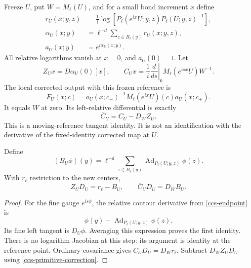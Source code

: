 Freeze \(U\), put \(W=M_\ell(U)\), and for a small bond increment
\(x\) define
\begin{equation}
 \begin{split}
 r_U(x;y,z)
   &=\frac1i\log\!\left[
       P_\ell(e^{ix}U;y,z)P_\ell(U;y,z)^{-1}\right],\\
 \alpha_U(x;y)&=\ell^{-d}\sum_{z\in B_\ell(y)}r_U(x;y,z),\\
 a_U(x;y)&=e^{i\alpha_U(x;y)}.
 \end{split}
 \label{ccs-relative-mean}
\end{equation}
All relative logarithms vanish at \(x=0\), and \(a_U(0)=1\).
Let
\begin{equation}
 Z_Ux=D\alpha_U(0)[x],\qquad
 C_Ux=\frac1i\left.\frac d{ds}\right|_0
                  M_\ell(e^{isx}U)W^{-1}.
 \label{ccs-tangents}
\end{equation}
The local corrected output with this frozen reference is
\[
 \overline F_U(x;c)=a_U(x;c_-)^{-1}
                         M_\ell(e^{ix}U)(c)a_U(x;c_+).
\]
It equals \(W\) at zero. Its left-relative differential is exactly
\begin{equation}
                     \overline C_U=C_U-D_WZ_U.
 \label{ccs-primitive-correction}
\end{equation}
This is a moving-reference tangent identity. It is not an
identification with the derivative of the fixed-identity corrected
map at \(U\).

\begin{lemma}
\label{ccs-primitive-lemma}
Define
\begin{equation}
 (B_U\phi)(y)=\ell^{-d}\sum_{z\in B_\ell(y)}
                  \operatorname{Ad}_{P_\ell(U;y,z)}\phi(z).
 \label{ccs-primitive-B}
\end{equation}
With \(r_\ell\) restriction to the new centers,
\begin{equation}
 Z_UD_U=r_\ell-B_U,\qquad
                  \overline C_UD_U=D_WB_U.
 \label{ccs-primitive-intertwining}
\end{equation}
\end{lemma}

\begin{proof}
For the fine gauge \(e^{is\phi}\), the relative contour derivative
from \eqref{ccs-endpoint} is
\[
 \phi(y)-\operatorname{Ad}_{P_\ell(U;y,z)}\phi(z).
\]
Its fine left tangent is \(D_U\phi\). Averaging this expression
proves the first identity. There is no logarithm Jacobian at this
step: its argument is identity at the reference point.
Ordinary covariance gives \(C_UD_U=D_Wr_\ell\). Subtract
\(D_WZ_UD_U\) using \eqref{ccs-primitive-correction}.
\end{proof}

